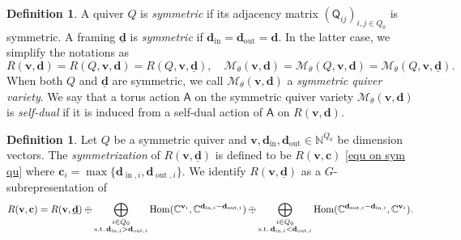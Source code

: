 \documentclass[10pt]{amsart}
\theoremstyle{definition}
\newtheorem{Definition}[Theorem]{Definition}
\numberwithin{equation}{section}
\newcommand{\bC}{\mathbb{C}}
\newcommand{\bN}{\mathbb{N}}
\newcommand{\bv}{\mathbf{v}}
\newcommand{\bd}{\mathbf{d}}
\newcommand{\cM}{\mathcal{M}}
\newcommand{\sA}{\mathsf{A}}
\newcommand{\Hom}{\operatorname{Hom}}
\newcommand{\In}{\operatorname{in}}
\newcommand{\Out}{\operatorname{out}}
\begin{document}
\begin{Definition}\label{def of sym qv}
A quiver $Q$ is \textit{symmetric} if its adjacency matrix $ (\mathsf Q_{ij})_{i,j\in Q_0}$ is symmetric. 
A framing $\underline{\bd}$ is \textit{symmetric} if $\bd_{\In}=\bd_{\Out}=\bd$. In the latter case, we simplify the notations as 
\begin{equation}\label{equ on sym qu}R(\bv,\bd)=R(Q,\bv,\bd)= R(Q,\mathbf{v},\underline{\bd}), \quad 
\cM_\theta(\bv,\bd)=\cM_\theta(Q,\bv,\bd)=\mathcal M_{\theta}(Q,\mathbf v,\underline{\bd}). \end{equation} 
When both $Q$ and $\underline{\bd}$ are symmetric, we call $\cM_\theta(\bv,\bd)$ a \textit{symmetric quiver variety}.  
We say that a torus action $\sA$ on the symmetric quiver variety $\cM_\theta(\mathbf v,\mathbf{d})$ is \textit{self-dual} if it is induced from a self-dual action of $\sA$ on $R(\mathbf v,\mathbf{d})$.
\end{Definition}

\begin{Definition}\label{def symmetrization}
Let $Q$ be a symmetric quiver and $\bv,\bd_{\In},\bd_{\Out}\in \bN^{Q_0}$ be dimension vectors. The \textit{symmetrization} of $R(\bv,\underline{\bd})$ is defined to be $R(\bv,\mathbf c)$ \eqref{equ on sym qu} where $\mathbf c_i=\max\{\bd_{\In,i},\bd_{\Out,i}\}$. We identify $R(\bv,\underline{\bd})$ as a $G$-subrepresentation of 
\begin{align*}
    R(\bv,\mathbf c)=R(\bv,\underline{\bd})\oplus \bigoplus_{\begin{subarray}{c}i\in Q_0 \\ \mathrm{s.t.}\, \bd_{\In,i}>\bd_{\Out,i}   \end{subarray}}
     \Hom(\bC^{\bv_i},\bC^{\bd_{\In,i}-\bd_{\Out,i}})\oplus \bigoplus_{\begin{subarray}{c}i\in Q_0 \\ \mathrm{s.t.}\, \bd_{\In,i}<\bd_{\Out,i}   \end{subarray}} \Hom(\bC^{\bd_{\Out,i}-\bd_{\In,i}},\bC^{\bv_i}).
\end{align*}
\end{Definition}
\end{document}
